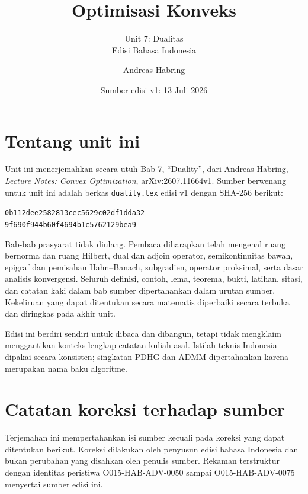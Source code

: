 \documentclass[indonesian]{shinybook}
\title{Optimisasi Konveks}
\subtitle{Unit 7: Dualitas\\Edisi Bahasa Indonesia}
\author{Andreas Habring}
\date{Sumber edisi v1: 13 Juli 2026}
\begin{document}
\maketitle

\frontmatter
\chapter*{Tentang unit ini}
Unit ini menerjemahkan secara utuh Bab 7, ``Duality'', dari Andreas Habring, \emph{Lecture Notes: Convex Optimization}, arXiv:2607.11664v1. Sumber berwenang untuk unit ini adalah berkas \texttt{duality.tex} edisi v1 dengan SHA-256 berikut:
\begin{center}
\small\texttt{0b112dee2582813cec5629c02df1dda32}\\[-0.2em]
\texttt{9f690f944b60f4694b1c5762129bea9}
\end{center}

Bab-bab prasyarat tidak diulang. Pembaca diharapkan telah mengenal ruang bernorma dan ruang Hilbert, dual dan adjoin operator, semikontinuitas bawah, epigraf dan pemisahan Hahn--Banach, subgradien, operator proksimal, serta dasar analisis konvergensi. Seluruh definisi, contoh, lema, teorema, bukti, latihan, sitasi, dan catatan kaki dalam bab sumber dipertahankan dalam urutan sumber. Kekeliruan yang dapat ditentukan secara matematis diperbaiki secara terbuka dan diringkas pada akhir unit.

Edisi ini berdiri sendiri untuk dibaca dan dibangun, tetapi tidak mengklaim menggantikan konteks lengkap catatan kuliah asal. Istilah teknis Indonesia dipakai secara konsisten; singkatan PDHG dan ADMM dipertahankan karena merupakan nama baku algoritme.

\tableofcontents
\mainmatter
\setcounter{chapter}{6}


\backmatter
\printbibliography[heading=bibintoc,title={Daftar pustaka}]

\chapter*{Catatan koreksi terhadap sumber}
Terjemahan ini mempertahankan isi sumber kecuali pada koreksi yang dapat ditentukan berikut. Koreksi dilakukan oleh penyusun edisi bahasa Indonesia dan bukan perubahan yang disahkan oleh penulis sumber. Rekaman terstruktur dengan identitas peristiwa O015-HAB-ADV-0050 sampai O015-HAB-ADV-0075 menyertai sumber edisi ini.
\end{document}
